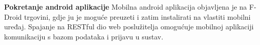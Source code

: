 			
		\textbf{Pokretanje android aplikacije}		
		 Mobilna android aplikacija objavljena je na F-Droid trgovini, gdje ju je moguće preuzeti i zatim instalirati na vlastiti mobilni uređaj. Spajanje na RESTful dio web poslužitelja omogućuje mobilnoj aplikaciji komunikaciju s bazom podataka i prijavu u sustav.